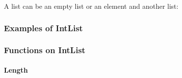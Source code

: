 A list can be an empty list or an element and another list:

\begin{Shaded}
\begin{Highlighting}[]
 
    \OtherTok{=} 
    \OperatorTok{|}    
    \NormalTok{ (}\NormalTok{)}
\end{Highlighting}
\end{Shaded}

\hypertarget{examples-of-intlist}{%
\subsubsection{Examples of IntList}\label{examples-of-intlist}}

\begin{Shaded}
\begin{Highlighting}[]
\OtherTok{=} 
\OtherTok{=}   
\OtherTok{=}  \NormalTok{ (} 
\OtherTok{=} \NormalTok{ (}\OperatorTok{{-}}
\OtherTok{=}  \NormalTok{ (} 
\OtherTok{=}  \NormalTok{ (} 
\end{Highlighting}
\end{Shaded}

\hypertarget{functions-on-intlist}{%
\subsubsection{Functions on IntList}\label{functions-on-intlist}}

\hypertarget{length}{%
\paragraph{Length}\label{length}}

\begin{Shaded}
\begin{Highlighting}[]
  \OtherTok{{-}\textgreater{}} 

 \OtherTok{=} 
\OtherTok{=}  \OperatorTok{+}
\end{Highlighting}
\end{Shaded}

